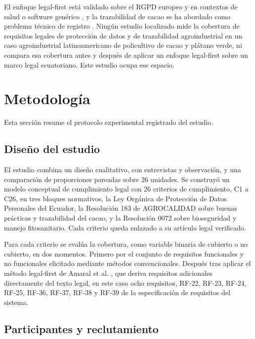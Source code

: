 \documentclass[pdflatex,sn-mathphys-num]{sn-jnl}
\begin{document}
El enfoque legal-first est\'a validado sobre el RGPD europeo y en contextos de salud o software gen\'erico \cite{breaux2008,massey2010,amaral2021,torre2021,negriribalta2024}, y la trazabilidad de cacao se ha abordado como problema t\'ecnico de registro \cite{arsyad2018,marchese2022}. Ning\'un estudio localizado mide la cobertura de requisitos legales de protecci\'on de datos y de trazabilidad agroindustrial en un caso agroindustrial latinoamericano de policultivo de cacao y pl\'atano verde, ni compara esa cobertura antes y despu\'es de aplicar un enfoque legal-first sobre un marco legal ecuatoriano. Este estudio ocupa ese espacio.

\section{Metodolog\'ia}\label{sec:metodologia}

Esta secci\'on resume el protocolo experimental registrado del estudio.

\subsection{Dise\~no del estudio}

El estudio combina un dise\~no cualitativo, con entrevistas y observaci\'on, y una comparaci\'on de proporciones pareadas sobre 26 unidades. Se construy\'o un modelo conceptual de cumplimiento legal con 26 criterios de cumplimiento, C1 a C26, en tres bloques normativos, la Ley Org\'anica de Protecci\'on de Datos Personales del Ecuador, la Resoluci\'on 183 de AGROCALIDAD sobre buenas pr\'acticas y trazabilidad del cacao, y la Resoluci\'on 0072 sobre bioseguridad y manejo fitosanitario. Cada criterio queda enlazado a su art\'iculo legal verificado.

Para cada criterio se eval\'ua la cobertura, como variable binaria de cubierto o no cubierto, en dos momentos. Primero por el conjunto de requisitos funcionales y no funcionales elicitado mediante m\'etodos convencionales. Despu\'es tras aplicar el m\'etodo legal-first de Amaral et al. \cite{amaral2021}, que deriva requisitos adicionales directamente del texto legal, en este caso ocho requisitos, RF-22, RF-23, RF-24, RF-25, RF-36, RF-37, RF-38 y RF-39 de la especificaci\'on de requisitos del sistema.

\subsection{Participantes y reclutamiento}
\end{document}
